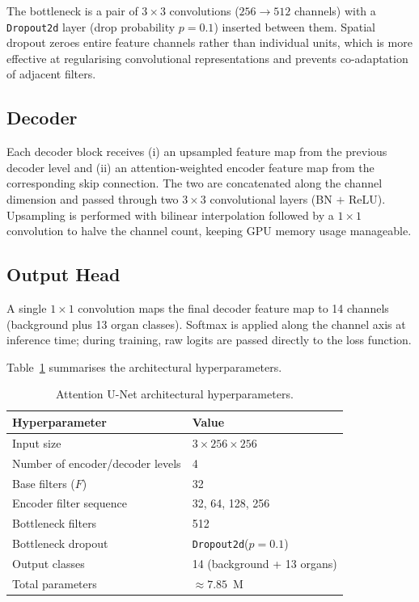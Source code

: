 The bottleneck is a pair of $3 \times 3$ convolutions ($256 \to 512$ channels) with a
\texttt{Dropout2d} layer (drop probability $p = 0.1$) inserted between them. Spatial dropout
zeroes entire feature channels rather than individual units, which is more effective at
regularising convolutional representations and prevents co-adaptation of adjacent filters.

\subsection{Decoder}

Each decoder block receives (i) an upsampled feature map from the previous decoder level and
(ii) an attention-weighted encoder feature map from the corresponding skip connection. The two
are concatenated along the channel dimension and passed through two $3 \times 3$ convolutional
layers (BN $+$ ReLU). Upsampling is performed with bilinear interpolation followed by a $1
\times 1$ convolution to halve the channel count, keeping GPU memory usage manageable.

\subsection{Output Head}

A single $1 \times 1$ convolution maps the final decoder feature map to 14 channels
(background plus 13 organ classes). Softmax is applied along the channel axis at inference
time; during training, raw logits are passed directly to the loss function.

Table~\ref{tab:arch_params} summarises the architectural hyperparameters.

\begin{table}[h!]
\centering
\caption{Attention U-Net architectural hyperparameters.}
\label{tab:arch_params}
\begin{tabular}{ll}
\toprule
\textbf{Hyperparameter} & \textbf{Value} \\
\midrule
Input size              & $3 \times 256 \times 256$ \\
Number of encoder/decoder levels & 4 \\
Base filters ($F$)      & 32 \\
Encoder filter sequence & 32, 64, 128, 256 \\
Bottleneck filters      & 512 \\
Bottleneck dropout      & \texttt{Dropout2d}($p = 0.1$) \\
Output classes          & 14 (background + 13 organs) \\
Total parameters        & $\approx 7.85$~M \\
\bottomrule
\end{tabular}
\end{table}

